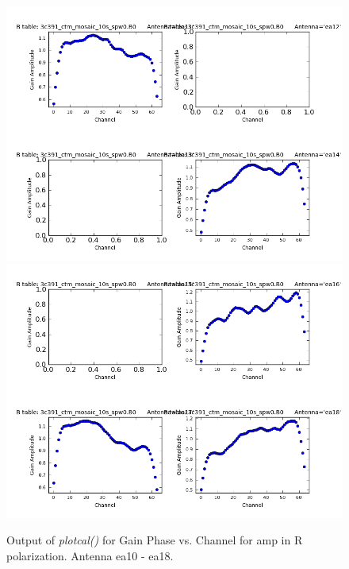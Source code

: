\documentclass[12pt, a4paper]{article}
\begin{document}
\begin{figure}[h!]
\centering
\includegraphics[scale=0.65]{../Imaging/plots2/part4-subE-question3a_amp_pol-R-ea10-ea14.png}
\includegraphics[scale=0.65]{../Imaging/plots2/part4-subE-question3a_amp_pol-R-ea15-ea18.png}
\caption{Output of \emph{plotcal()} for Gain Phase vs. Channel for amp in R polarization. Antenna ea10 - ea18.}
\end{figure}
\addtocounter{figure}{-1}
\end{document}
